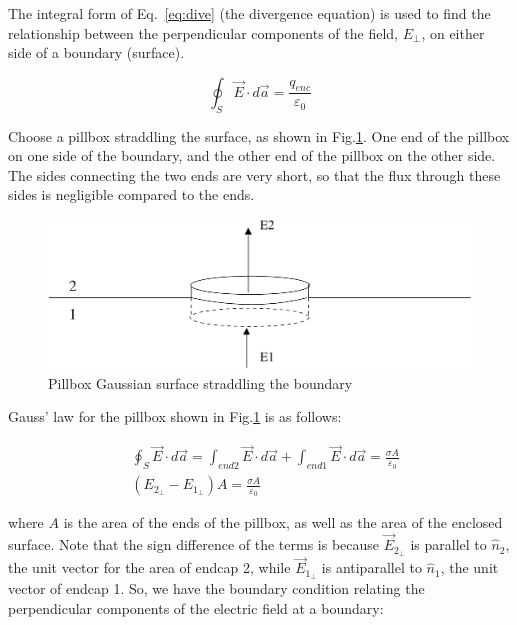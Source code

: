 \documentclass[12pt]{article}
\begin{document}
\begin{flushleft}
The integral form of Eq.~\ref{eq:dive} (the divergence equation) is used to find the relationship between the perpendicular components of the field, $E_{\perp}$, on either side of a boundary (surface).  

\begin{equation*}
\oint_{S} \vec{E} \cdot d\vec{a} = \frac{q_{enc}}{\varepsilon_{0}} 
\label{eq:gauss}
\end{equation*}    

Choose a pillbox straddling the surface, as shown in Fig.\ref{fig:pillbox}.  One end of the pillbox on one side of the boundary, and the other end of the pillbox on the other side.  The sides connecting the two ends are very short, so that the flux through these sides is negligible compared to the ends.
\vspace{.2in}

\begin{figure}[h]
\centering
\includegraphics*[trim=0cm 0cm 0cm 0cm, clip=true, width=0.6\columnwidth]{Eperp_bc.pdf}
\caption{Pillbox Gaussian surface straddling the boundary }
\label{fig:pillbox}
\end{figure}
\vspace{.2in}

Gauss' law for the pillbox shown in Fig.\ref{fig:pillbox} is as follows:

\begin{equation*}
\begin{aligned}
& \oint_{S} \vec{E} \cdot d\vec{a} = \int_{end2} \vec{E} \cdot d\vec{a}+ \int_{end1} \vec{E} \cdot d\vec{a} = \frac{\sigma A}{\varepsilon_{0}} \\
& (E_{2_{\perp}} - E_{1_{\perp}}) A  =\frac{\sigma A}{\varepsilon_{0}} 
\end{aligned} 
\end{equation*}

where $A$ is the area of the ends of the pillbox, as well as the area of the enclosed surface.  Note that the sign difference of the terms is because $\vec{E}_{2_{\perp}}$ is parallel to $\hat{n}_{2}$, the unit vector for the area of endcap 2, while $\vec{E}_{1_{\perp}}$ is antiparallel to $\hat{n}_{1}$, the unit vector of endcap 1.  So, we have the boundary condition relating the perpendicular components of the electric field at a boundary:


\end{flushleft}
\end{document}
